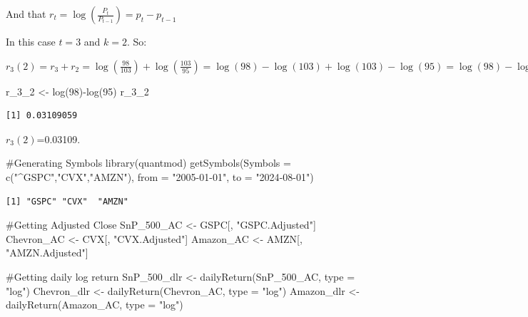 \documentclass[
  letterpaper,
  DIV=11,
  numbers=noendperiod]{scrartcl}
\newenvironment{Shaded}{\begin{snugshade}}{\end{snugshade}}
\newcommand{\AttributeTok}[1]{\textcolor[rgb]{0.40,0.45,0.13}{#1}}
\newcommand{\CommentTok}[1]{\textcolor[rgb]{0.37,0.37,0.37}{#1}}
\newcommand{\DecValTok}[1]{\textcolor[rgb]{0.68,0.00,0.00}{#1}}
\newcommand{\FunctionTok}[1]{\textcolor[rgb]{0.28,0.35,0.67}{#1}}
\newcommand{\NormalTok}[1]{\textcolor[rgb]{0.00,0.23,0.31}{#1}}
\newcommand{\OtherTok}[1]{\textcolor[rgb]{0.00,0.23,0.31}{#1}}
\newcommand{\SpecialCharTok}[1]{\textcolor[rgb]{0.37,0.37,0.37}{#1}}
\newcommand{\StringTok}[1]{\textcolor[rgb]{0.13,0.47,0.30}{#1}}
\begin{document}
And that \(r_t=\log(\frac{P_t}{P_{t-1}})=p_t-p_{t-1}\)

In this case \(t =3\) and \(k=2\). So:

\(r_3(2)=r_3+r_2=\log(\frac{98}{103})+\log(\frac{103}{95})=\log(98)-\log(103)+\log(103)-\log(95)=\log(98)-\log(95)\)

\begin{Shaded}
\begin{Highlighting}[]
\NormalTok{r\_3\_2 }\OtherTok{\textless{}{-}} \FunctionTok{log}\NormalTok{(}\DecValTok{98}\NormalTok{)}\SpecialCharTok{{-}}\FunctionTok{log}\NormalTok{(}\DecValTok{95}\NormalTok{)}
\NormalTok{r\_3\_2}
\end{Highlighting}
\end{Shaded}

\begin{verbatim}
[1] 0.03109059
\end{verbatim}

\(r_3(2)\)=0.03109.

\begin{Shaded}
\begin{Highlighting}[]
\CommentTok{\#Generating Symbols}
\FunctionTok{library}\NormalTok{(quantmod)}
\FunctionTok{getSymbols}\NormalTok{(}\AttributeTok{Symbols =} \FunctionTok{c}\NormalTok{(}\StringTok{"\^{}GSPC"}\NormalTok{,}\StringTok{"CVX"}\NormalTok{,}\StringTok{"AMZN"}\NormalTok{), }
           \AttributeTok{from =} \StringTok{"2005{-}01{-}01"}\NormalTok{, }\AttributeTok{to =} \StringTok{"2024{-}08{-}01"}\NormalTok{)}
\end{Highlighting}
\end{Shaded}

\begin{verbatim}
[1] "GSPC" "CVX"  "AMZN"
\end{verbatim}

\begin{Shaded}
\begin{Highlighting}[]
\CommentTok{\#Getting Adjusted Close}
\NormalTok{SnP\_500\_AC }\OtherTok{\textless{}{-}}\NormalTok{ GSPC[, }\StringTok{"GSPC.Adjusted"}\NormalTok{]}
\NormalTok{Chevron\_AC }\OtherTok{\textless{}{-}}\NormalTok{ CVX[, }\StringTok{"CVX.Adjusted"}\NormalTok{]}
\NormalTok{Amazon\_AC }\OtherTok{\textless{}{-}}\NormalTok{ AMZN[, }\StringTok{"AMZN.Adjusted"}\NormalTok{]}
\end{Highlighting}
\end{Shaded}

\begin{Shaded}
\begin{Highlighting}[]
\CommentTok{\#Getting daily log return}
\NormalTok{SnP\_500\_dlr }\OtherTok{\textless{}{-}} \FunctionTok{dailyReturn}\NormalTok{(SnP\_500\_AC, }\AttributeTok{type =} \StringTok{"log"}\NormalTok{)}
\NormalTok{Chevron\_dlr }\OtherTok{\textless{}{-}} \FunctionTok{dailyReturn}\NormalTok{(Chevron\_AC, }\AttributeTok{type =} \StringTok{"log"}\NormalTok{)}
\NormalTok{Amazon\_dlr }\OtherTok{\textless{}{-}} \FunctionTok{dailyReturn}\NormalTok{(Amazon\_AC, }\AttributeTok{type =} \StringTok{"log"}\NormalTok{)}
\end{Highlighting}
\end{Shaded}
\end{document}
